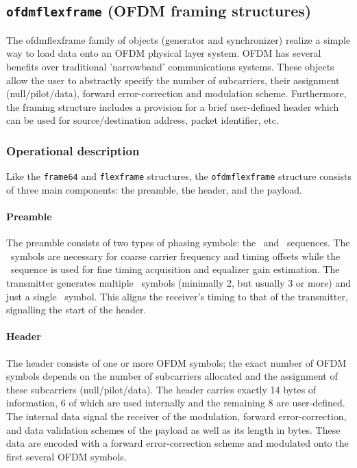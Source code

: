 % 
%
\subsection{{\tt ofdmflexframe} (OFDM framing structures)}
\label{module:framing:ofdmflexframe}

The ofdmflexframe family of objects (generator and synchronizer)
realize a simple way to load data onto an OFDM physical layer
system. OFDM has several benefits over traditional 'narrowband'
communications systems.
These objects allow the user to abstractly specify the number of
subcarriers, their assignment (null/pilot/data), forward
error-correction and modulation scheme.
Furthermore, the framing structure includes a provision for a brief
user-defined header which can be used for source/destination
address, packet identifier, etc.

\subsubsection{Operational description}
\label{module:framing:ofdmflexframe:operation}
Like the {\tt frame64} and {\tt flexframe} structures,
the {\tt ofdmflexframe} structure consists of three main components:
the preamble, the header, and the payload.
    
\paragraph{Preamble}
    The preamble consists of two types of phasing symbols: the \Ss\ and
    \Sl\ sequences.
    The \Ss\ symbols are necessary for coarse carrier frequency
    and timing offsets while the \Sl\ sequence is used for fine timing
    acquisition and equalizer gain estimation.  The transmitter
    generates multiple \Ss\ symbols (minimally 2, but usually 3 or more)
    and just a single \Sl\ symbol. This aligns the receiver's timing to
    that of the transmitter, signalling the start of the header.

\paragraph{Header}
    The header consists of one or more OFDM symbols; the exact number of
    OFDM symbols depends on the number of subcarriers allocated and the
    assignment of these subcarriers (null/pilot/data). The header
    carries exactly 14 bytes of information, 6 of which are used
    internally and the remaining 8 are user-defined. The internal data
    signal the receiver of the modulation, forward error-correction, and
    data validation schemes of the payload as well as its length in
    bytes. These data are encoded with a forward error-correction scheme
    and modulated onto the first several OFDM symbols.

